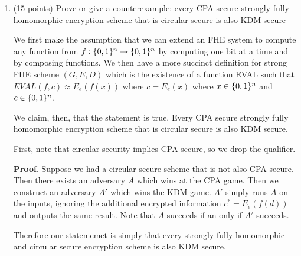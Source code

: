 \documentclass{article}
\begin{document}
\begin{enumerate}[,label=\alph*.]
\item{}
(15 points) Prove or give a counterexample: every CPA secure strongly fully homomorphic encryption scheme that is circular secure is also KDM secure%

We first make the assumption that we can extend an FHE system to compute any function from $f: \{0,1\}^n \to \{0,1\}^n$
by computing one bit at a time and by composing functions. We then have a more succinct definition
for strong FHE scheme $(G,E,D)$ which is the existence of a function EVAL such that $EVAL(f, c) \approx E_e(f(x))$
where $c= E_e(x)$ where $x \in \{0,1\}^n$ and $c \in \{0,1\}^n$.%

We claim, then, that the statement is true. Every CPA secure strongly fully homomorphic encryption scheme
that is circular secure is also KDM secure.%

First, note that circular security implies CPA secure, so we drop the qualifier.%

\begin{mdbmarginx}{1ex}{0pt}{1ex}{0pt}%
\noindent{}\textbf{Proof}.   Suppose we had a circular secure scheme that is not also CPA secure. Then there exists an adversary
 $A$ which wins at the CPA game. Then we construct an adversary $A'$ which wins the KDM game. $A'$
 simply runs $A$ on the inputs, ignoring the additional encrypted information $c^* = E_e(f(d))$ and
 outputs the same result. Note that $A$ succeeds if an only if $A'$ succeeds.
 \mdfloatright{\ensuremath{\Box}}%
\end{mdbmarginx}%

Therefore our statememet is simply that every strongly fully homomorphic and circular secure encryption scheme 
is also KDM secure.%


\end{enumerate}
\end{document}
